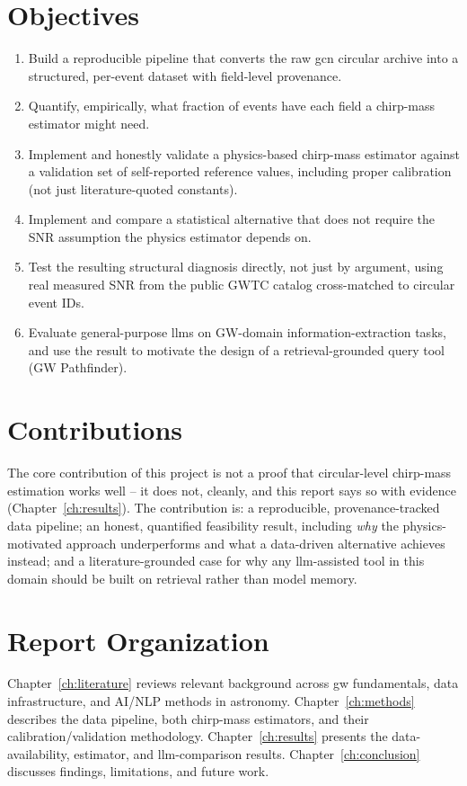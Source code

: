 \section{Objectives}

\begin{enumerate}
    \item Build a reproducible pipeline that converts the raw \gls{gcn} circular archive into a structured, per-event dataset with field-level provenance.
    \item Quantify, empirically, what fraction of events have each field a chirp-mass estimator might need.
    \item Implement and honestly validate a physics-based chirp-mass estimator against a validation set of self-reported reference values, including proper calibration (not just literature-quoted constants).
    \item Implement and compare a statistical alternative that does not require the SNR assumption the physics estimator depends on.
    \item Test the resulting structural diagnosis directly, not just by argument, using real measured SNR from the public GWTC catalog cross-matched to circular event IDs.
    \item Evaluate general-purpose \glspl{llm} on GW-domain information-extraction tasks, and use the result to motivate the design of a retrieval-grounded query tool (GW Pathfinder).
\end{enumerate}

\section{Contributions}

The core contribution of this project is not a proof that circular-level chirp-mass estimation works well -- it does not, cleanly, and this report says so with evidence (Chapter~\ref{ch:results}). The contribution is: a reproducible, provenance-tracked data pipeline; an honest, quantified feasibility result, including \emph{why} the physics-motivated approach underperforms and what a data-driven alternative achieves instead; and a literature-grounded case for why any \gls{llm}-assisted tool in this domain should be built on retrieval rather than model memory.

\section{Report Organization}

Chapter~\ref{ch:literature} reviews relevant background across \gls{gw} fundamentals, data infrastructure, and AI/NLP methods in astronomy. Chapter~\ref{ch:methods} describes the data pipeline, both chirp-mass estimators, and their calibration/validation methodology. Chapter~\ref{ch:results} presents the data-availability, estimator, and \gls{llm}-comparison results. Chapter~\ref{ch:conclusion} discusses findings, limitations, and future work.
